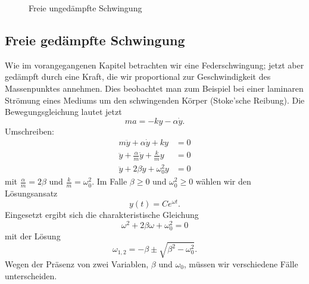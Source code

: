 \documentclass[%
11pt,%
twoside,%
titlepage,%
swissgerman,%
headsepline%
]{scrartcl}
\theoremstyle{definition}
\theoremstyle{plain}
\begin{document}
\begin{figure}
\begin{center}

\end{center}
\caption{Freie un\-ge\-dämpf\-te Schwingung}
\end{figure}

\subsection{Freie gedämpfte Schwingung}

Wie im vorangegangenen Kapitel betrachten wir eine Federschwingung; jetzt aber
gedämpft durch eine Kraft, die wir proportional zur Geschwindigkeit des Massenpunktes annehmen. Dies beobachtet man zum Beispiel bei einer laminaren Strömung eines Mediums um den schwingenden Körper (Stoke'sche Reibung). Die Bewegungsgleichung lautet jetzt
$$ma=-ky-\alpha \dot{y}.$$
Umschreiben:
\begin{align*}
m\ddot{y}+\alpha \dot{y}+ky &= 0\\
\ddot{y} +\frac{\alpha}{m}\dot{y}+\frac{k}{m}y&=0\\
\ddot{y}+2\beta\dot{y}+\omega_0^2 y &=0
\end{align*}
mit $\frac{\alpha}{m}=2\beta$ und $\frac{k}{m}=\omega_0^2$.
Im Falle $\beta\geq0$ und $\omega_0^2\geq0$ wählen wir den Lösungsansatz
$$y(t)=Ce^{\omega t}.$$
Eingesetzt ergibt sich die charakteristische Gleichung
$$\omega^2+2\beta\omega+\omega_0^2=0$$
mit der Lösung
$$\omega_{1,2}=-\beta\pm\sqrt{\beta^2-\omega_0^2}.$$
Wegen der Präsenz von zwei Variablen, $\beta$ und $\omega_0$, müssen wir verschiedene Fälle unterscheiden.
\end{document}
